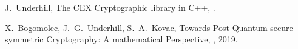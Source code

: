 \documentclass[a4paper,11pt]{article}
\begin{document}
\begin{otherlanguage}{english}
\begin{thebibliography}{1}
J.~Underhill,
  \newblock The CEX Cryptographic library in C++,
  .

X.~Bogomolec, J.~G.~Underhill, S.~A.~Kovac,
  \newblock Towards Post-Quantum secure symmetric Cryptography: 
A mathematical Perspective,  
  , 2019.


  
\end{thebibliography}



\end{otherlanguage}
\end{document}
